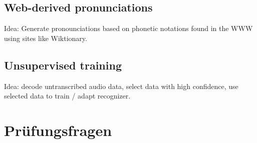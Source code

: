 \subsection{Web-derived pronunciations}

Idea: Generate pronounciations based on phonetic notations found in the WWW using sites like Wiktionary.

\subsection{Unsupervised training}

Idea: decode untranscribed audio data, select data with high confidence, use selected data to train / adapt recognizer.

\newpage
\section{Prüfungsfragen}
